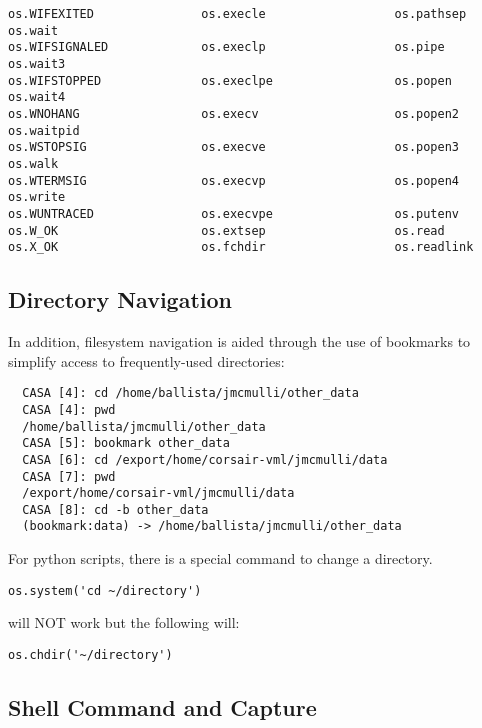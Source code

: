 \begin{verbatim}
os.WIFEXITED               os.execle                  os.pathsep                 os.wait
os.WIFSIGNALED             os.execlp                  os.pipe                    os.wait3
os.WIFSTOPPED              os.execlpe                 os.popen                   os.wait4
os.WNOHANG                 os.execv                   os.popen2                  os.waitpid
os.WSTOPSIG                os.execve                  os.popen3                  os.walk
os.WTERMSIG                os.execvp                  os.popen4                  os.write
os.WUNTRACED               os.execvpe                 os.putenv                  
os.W_OK                    os.extsep                  os.read                    
os.X_OK                    os.fchdir                  os.readlink                

\end{verbatim}
\normalsize




\subsection{Directory Navigation}
\label{section:python.sys.navi}

In addition, filesystem navigation is aided through the use of
bookmarks to simplify access to frequently-used directories: 
\small
\begin{verbatim}
  CASA [4]: cd /home/ballista/jmcmulli/other_data
  CASA [4]: pwd
  /home/ballista/jmcmulli/other_data
  CASA [5]: bookmark other_data
  CASA [6]: cd /export/home/corsair-vml/jmcmulli/data
  CASA [7]: pwd
  /export/home/corsair-vml/jmcmulli/data
  CASA [8]: cd -b other_data
  (bookmark:data) -> /home/ballista/jmcmulli/other_data
\end{verbatim}
\normalsize

For python scripts, there is a special command to change a directory. 
\small
\begin{verbatim}
os.system('cd ~/directory')
\end{verbatim}
\normalsize
will NOT work but the following will:
\small
\begin{verbatim}
os.chdir('~/directory')
\end{verbatim}
\normalsize



\subsection{Shell Command and Capture}
\label{section:python.sys.capture}

